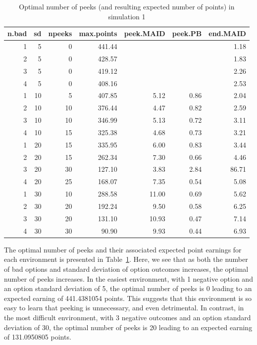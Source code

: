 \documentclass[a4paper,doc,natbib,floatsintext]{apa6}\usepackage[]{graphicx}\usepackage[]{color}
\begin{document}
\begin{table}[ht]
\centering
\begin{tabular}{rrrrrrr}
  \hline
n.bad & sd & npeeks & max.points & peek.MAID & peek.PB & end.MAID \\ 
  \hline
  1 &   5 &   0 & 441.44 &  &  & 1.18 \\ 
    2 &   5 &   0 & 428.57 &  &  & 1.83 \\ 
    3 &   5 &   0 & 419.12 &  &  & 2.26 \\ 
    4 &   5 &   0 & 408.16 &  &  & 2.53 \\ 
    1 &  10 &   5 & 407.85 & 5.12 & 0.86 & 2.04 \\ 
    2 &  10 &  10 & 376.44 & 4.47 & 0.82 & 2.59 \\ 
    3 &  10 &  10 & 346.99 & 5.13 & 0.72 & 3.11 \\ 
    4 &  10 &  15 & 325.38 & 4.68 & 0.73 & 3.21 \\ 
    1 &  20 &  15 & 335.95 & 6.00 & 0.83 & 3.44 \\ 
    2 &  20 &  15 & 262.34 & 7.30 & 0.66 & 4.46 \\ 
    3 &  20 &  30 & 127.10 & 3.83 & 2.84 & 86.71 \\ 
    4 &  20 &  25 & 168.07 & 7.35 & 0.54 & 5.08 \\ 
    1 &  30 &  10 & 288.58 & 11.00 & 0.69 & 5.62 \\ 
    2 &  30 &  20 & 192.24 & 9.50 & 0.58 & 6.25 \\ 
    3 &  30 &  20 & 131.10 & 10.93 & 0.47 & 7.14 \\ 
    4 &  30 &  30 & 90.90 & 9.93 & 0.44 & 6.93 \\ 
   \hline
\end{tabular}
\caption{Optimal number of peeks (and resulting expected number of points) in simulation 1} 
\label{table:optimalsim1}
\end{table}


The optimal number of peeks and their associated expected point earnings for each environment is presented in Table~\ref{table:optimalsim1}. Here, we see that as both the number of bad options and standard deviation of option outcomes increases, the optimal number of peeks increases. In the easiest environment, with 1 negative option and an option standard deviation of 5, the optimal number of peeks is 0 leading to an expected earning of 441.4381054 points. This suggests that this environment is so easy to learn that peeking is unnecessary, and even detrimental. In contrast, in the most difficult environment, with 3 negative outcomes and an option standard deviation of 30, the optimal number of peeks is 20 leading to an expected earning of 131.0950805 points.
\end{document}
